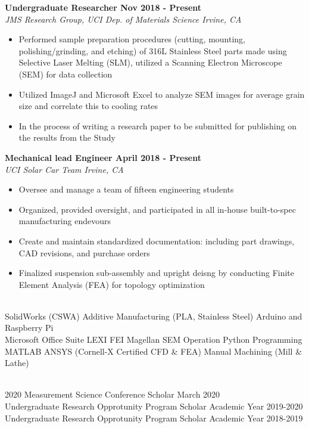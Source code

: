 \documentclass[10pt]{article}
\newenvironment{indentsection}[1]%
{\begin{list}{}%
	{\setlength{\leftmargin}{#1}}%
	\item[]%
}
{\end{list}}
\begin{document}

\begin{indentsection}{\parindent}
    \textbf{Undergraduate Researcher \hfill Nov 2018 - Present}\\
    \textit{JMS Research Group, UCI Dep. of Materials Science \hfill Irvine, CA}
    \begin{itemize}
        \item Performed sample preparation procedures (cutting, mounting, polishing/grinding, and etching) of 316L Stainless Steel parts made using Selective Laser Melting (SLM), utilized a Scanning Electron Microscope (SEM) for data collection
        \item Utilized ImageJ and Microsoft Excel to analyze SEM images for average grain size and correlate this to cooling rates
        \item In the process of writing a research paper to be submitted for publishing on the results from the Study
    \end{itemize}

    \vspace{0.08in}

    \textbf{Mechanical lead Engineer \hfill April 2018 - Present}\\
    \textit{UCI Solar Car Team \hfill Irvine, CA}
    \begin{itemize}
        \item Oversee and manage a team of fifteen engineering students
        \item Organized, provided oversight, and participated in all in-house built-to-spec manufacturing endevours
        \item Create and maintain standardized documentation: including part drawings, CAD revisions, and purchase orders
        \item Finalized suspension sub-assembly and upright deisng by conducting Finite Element Analysis (FEA) for topology optimization
    \end{itemize}
\end{indentsection}

\\
SolidWorks (CSWA) \hfill Additive Manufacturing (PLA, Stainless Steel) \hfill Arduino and Raspberry Pi\\
Microsoft Office Suite \hfill LEXI FEI Magellan SEM Operation \hfill Python Programming\\
MATLAB \hfill ANSYS (Cornell-X Certified CFD \& FEA) \hfill Manual Machining (Mill \& Lathe)

\vspace{0.15in}

\\
2020 Measurement Science Conference Scholar \hfill March 2020\\
Undergraduate Research Opprotunity Program Scholar \hfill Academic Year 2019-2020\\
Undergraduate Research Opprotunity Program Scholar \hfill Academic Year 2018-2019
\end{document}
